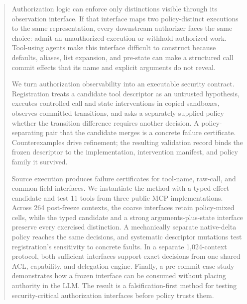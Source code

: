 \begin{abstract}
Authorization logic can enforce only distinctions visible through its
observation interface. If that interface maps two policy-distinct executions
to the same representation, every downstream authorizer faces the same choice:
admit an unauthorized execution or withhold authorized work. Tool-using agents
make this interface difficult to construct because defaults, aliases, list
expansion, and pre-state can make a structured call commit effects that its
name and explicit arguments do not reveal.

We turn authorization observability into an executable security contract.
Registration treats a candidate tool descriptor as an untrusted hypothesis,
executes controlled call and state interventions in copied sandboxes, observes
committed transitions, and asks a separately supplied policy whether the
transition difference requires another decision. A policy-separating pair that
the candidate merges is a concrete failure certificate. Counterexamples drive
refinement; the resulting validation record binds the frozen descriptor to the
implementation, intervention manifest, and policy family it survived.

Source execution produces failure certificates for tool-name, raw-call, and
common-field interfaces. We instantiate the method with a typed-effect
candidate and test 11 tools from three public MCP implementations. Across 264
post-freeze contexts, the coarse interfaces retain policy-mixed cells, while
the typed candidate and a strong arguments-plus-state interface preserve every
exercised distinction. A mechanically separate native-delta policy reaches the
same decisions, and systematic descriptor mutations test registration's
sensitivity to concrete faults. In a separate 1,024-context protocol, both
sufficient interfaces support exact decisions from one shared ACL,
capability, and delegation engine. Finally, a pre-commit case study demonstrates
how a frozen interface can be consumed without placing authority in the LLM.
The result is a falsification-first method for testing security-critical
authorization interfaces before policy trusts them.
\end{abstract}
